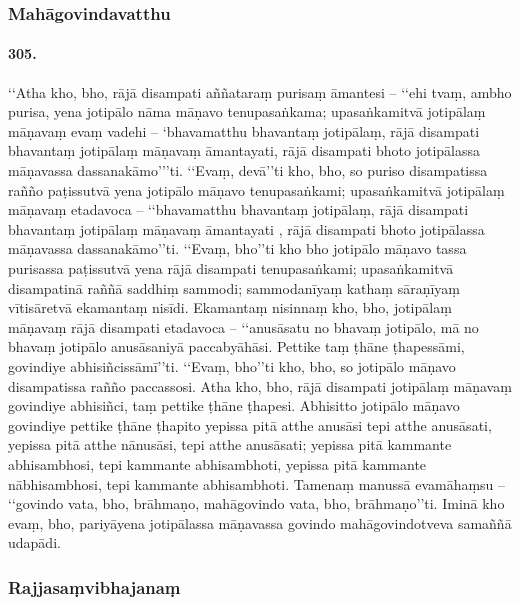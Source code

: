 \subsubsection{Mahāgovindavatthu}

\paragraph{305.} ‘‘Atha kho, bho, rājā disampati aññataraṃ purisaṃ āmantesi – ‘‘ehi tvaṃ, ambho purisa, yena jotipālo nāma māṇavo tenupasaṅkama; upasaṅkamitvā jotipālaṃ māṇavaṃ evaṃ vadehi – ‘bhavamatthu bhavantaṃ jotipālaṃ, rājā disampati bhavantaṃ jotipālaṃ māṇavaṃ āmantayati, rājā disampati bhoto jotipālassa māṇavassa dassanakāmo’’’ti. ‘‘Evaṃ, devā’’ti kho, bho, so puriso disampatissa rañño paṭissutvā yena jotipālo māṇavo tenupasaṅkami; upasaṅkamitvā jotipālaṃ māṇavaṃ etadavoca – ‘‘bhavamatthu bhavantaṃ jotipālaṃ, rājā disampati bhavantaṃ jotipālaṃ māṇavaṃ āmantayati , rājā disampati bhoto jotipālassa māṇavassa dassanakāmo’’ti. ‘‘Evaṃ, bho’’ti kho bho jotipālo māṇavo tassa purisassa paṭissutvā yena rājā disampati tenupasaṅkami; upasaṅkamitvā disampatinā raññā saddhiṃ sammodi; sammodanīyaṃ kathaṃ sāraṇīyaṃ vītisāretvā ekamantaṃ nisīdi. Ekamantaṃ nisinnaṃ kho, bho, jotipālaṃ māṇavaṃ rājā disampati etadavoca – ‘‘anusāsatu no bhavaṃ jotipālo, mā no bhavaṃ jotipālo anusāsaniyā paccabyāhāsi. Pettike taṃ ṭhāne ṭhapessāmi, govindiye abhisiñcissāmī’’ti. ‘‘Evaṃ, bho’’ti kho, bho, so jotipālo māṇavo disampatissa rañño paccassosi. Atha kho, bho, rājā disampati jotipālaṃ māṇavaṃ govindiye abhisiñci, taṃ pettike ṭhāne ṭhapesi. Abhisitto jotipālo māṇavo govindiye pettike ṭhāne ṭhapito yepissa pitā atthe anusāsi tepi atthe anusāsati, yepissa pitā atthe nānusāsi, tepi atthe anusāsati; yepissa pitā kammante abhisambhosi, tepi kammante abhisambhoti, yepissa pitā kammante nābhisambhosi, tepi kammante abhisambhoti. Tamenaṃ manussā evamāhaṃsu – ‘‘govindo vata, bho, brāhmaṇo, mahāgovindo vata, bho, brāhmaṇo’’ti. Iminā kho evaṃ, bho, pariyāyena jotipālassa māṇavassa govindo mahāgovindotveva samaññā udapādi.

\subsubsection{Rajjasaṃvibhajanaṃ}

